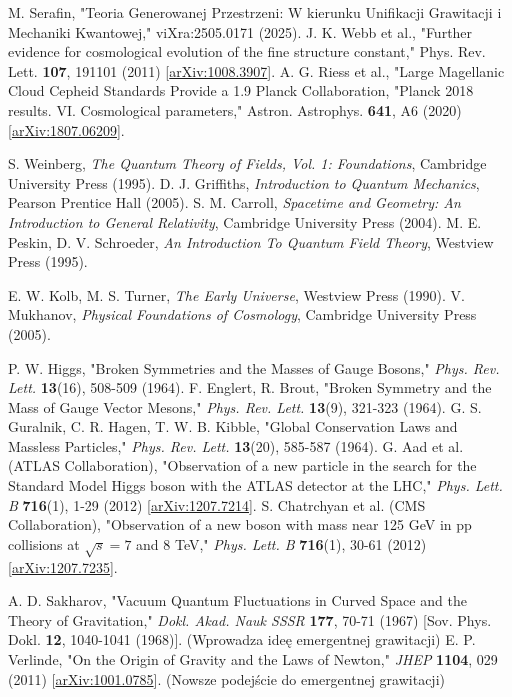 \documentclass[11pt,a4paper]{article}
\begin{document}
\begin{thebibliography}{99}
 M. Serafin, "Teoria Generowanej Przestrzeni: W kierunku Unifikacji Grawitacji i Mechaniki Kwantowej," viXra:2505.0171 (2025).
 J. K. Webb et al., "Further evidence for cosmological evolution of the fine structure constant," Phys. Rev. Lett. \textbf{107}, 191101 (2011) [\url{arXiv:1008.3907}].
 A. G. Riess et al., "Large Magellanic Cloud Cepheid Standards Provide a 1.9
 Planck Collaboration, "Planck 2018 results. VI. Cosmological parameters," Astron. Astrophys. \textbf{641}, A6 (2020) [\url{arXiv:1807.06209}].


 S. Weinberg, \textit{The Quantum Theory of Fields, Vol. 1: Foundations}, Cambridge University Press (1995).
 D. J. Griffiths, \textit{Introduction to Quantum Mechanics}, Pearson Prentice Hall (2005).
 S. M. Carroll, \textit{Spacetime and Geometry: An Introduction to General Relativity}, Cambridge University Press (2004).
 M. E. Peskin, D. V. Schroeder, \textit{An Introduction To Quantum Field Theory}, Westview Press (1995).

 E. W. Kolb, M. S. Turner, \textit{The Early Universe}, Westview Press (1990).
 V. Mukhanov, \textit{Physical Foundations of Cosmology}, Cambridge University Press (2005).

 P. W. Higgs, "Broken Symmetries and the Masses of Gauge Bosons," \textit{Phys. Rev. Lett.} \textbf{13}(16), 508-509 (1964).
 F. Englert, R. Brout, "Broken Symmetry and the Mass of Gauge Vector Mesons," \textit{Phys. Rev. Lett.} \textbf{13}(9), 321-323 (1964).
 G. S. Guralnik, C. R. Hagen, T. W. B. Kibble, "Global Conservation Laws and Massless Particles," \textit{Phys. Rev. Lett.} \textbf{13}(20), 585-587 (1964).
 G. Aad et al. (ATLAS Collaboration), "Observation of a new particle in the search for the Standard Model Higgs boson with the ATLAS detector at the LHC," \textit{Phys. Lett. B} \textbf{716}(1), 1-29 (2012) [\url{arXiv:1207.7214}].
 S. Chatrchyan et al. (CMS Collaboration), "Observation of a new boson with mass near 125 GeV in pp collisions at $\sqrt{s}=7$ and 8 TeV," \textit{Phys. Lett. B} \textbf{716}(1), 30-61 (2012) [\url{arXiv:1207.7235}].

 A. D. Sakharov, "Vacuum Quantum Fluctuations in Curved Space and the Theory of Gravitation," \textit{Dokl. Akad. Nauk SSSR} \textbf{177}, 70-71 (1967) [Sov. Phys. Dokl. \textbf{12}, 1040-1041 (1968)]. (Wprowadza ideę emergentnej grawitacji)
 E. P. Verlinde, "On the Origin of Gravity and the Laws of Newton," \textit{JHEP} \textbf{1104}, 029 (2011) [\url{arXiv:1001.0785}]. (Nowsze podejście do emergentnej grawitacji)


\end{thebibliography}
\end{document}
